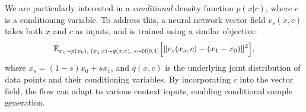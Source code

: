 We are particularly interested in a \emph{conditional} density function \(p(x | c)\), where \(c\) is a conditioning variable. To address this, a neural network vector field \(v_s(x, c)\) takes both \(x\) and \(c\) as inputs, and is trained using a similar objective:
\begin{equation}
\label{eq:cfmloss}
\mathbb{E}_{x_0 \sim p(x_0), \; (x_1,c) \sim q(x,c), \; s \sim \mathcal{U}[0,1]}
\Bigl[
    \| v_s(x_s, c) - (x_1 - x_0) \|^2
\Bigr],
\end{equation}
where $x_s = (1-s)x_0 + s x_1$, and \(q(x,c)\) is the underlying joint distribution of data points and their conditioning variables. By incorporating \(c\) into the vector field, the flow can adapt to various context inputs, enabling conditional sample generation.
